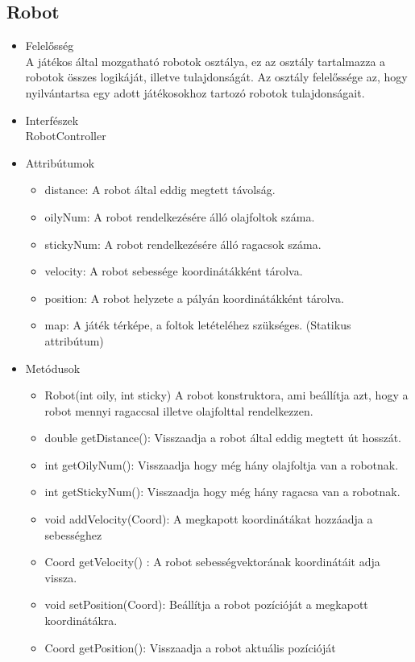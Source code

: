 \subsection{Robot}
\begin{itemize}
	\item Felelősség\\
	A játékos által mozgatható robotok osztálya, ez az osztály tartalmazza a robotok összes logikáját, illetve tulajdonságát. Az osztály felelőssége az, hogy nyilvántartsa egy adott játékosokhoz tartozó robotok tulajdonságait.
	\item Interfészek\\
	RobotController
	\item Attribútumok
	\begin{itemize}
		\item distance: A robot által eddig megtett távolság.
		\item oilyNum: A robot rendelkezésére álló olajfoltok száma.
		\item stickyNum: A robot rendelkezésére álló ragacsok száma.
		\item velocity: A robot sebessége koordinátákként tárolva.
		\item position: A robot helyzete a pályán koordinátákként tárolva.
		\item map: A játék térképe, a foltok letételéhez szükséges. (Statikus attribútum)
	\end{itemize}
	\item Metódusok
	\begin{itemize}
		\item Robot(int oily, int sticky) A robot konstruktora, ami beállítja azt, hogy a robot mennyi ragaccsal illetve olajfolttal rendelkezzen.
		\item double getDistance(): Visszaadja a robot által eddig megtett út hosszát.
		\item int getOilyNum(): Visszaadja hogy még hány olajfoltja van a robotnak.
		\item int getStickyNum(): Visszaadja hogy még hány ragacsa van a robotnak.
		\item void addVelocity(Coord): A megkapott koordinátákat hozzáadja a sebességhez
		\item Coord getVelocity() : A robot sebességvektorának koordinátáit adja vissza.
		\item void setPosition(Coord): Beállítja a robot pozícióját a megkapott koordinátákra.
		\item Coord getPosition(): Visszaadja a robot aktuális pozícióját

\end{itemize}
\end{itemize}
